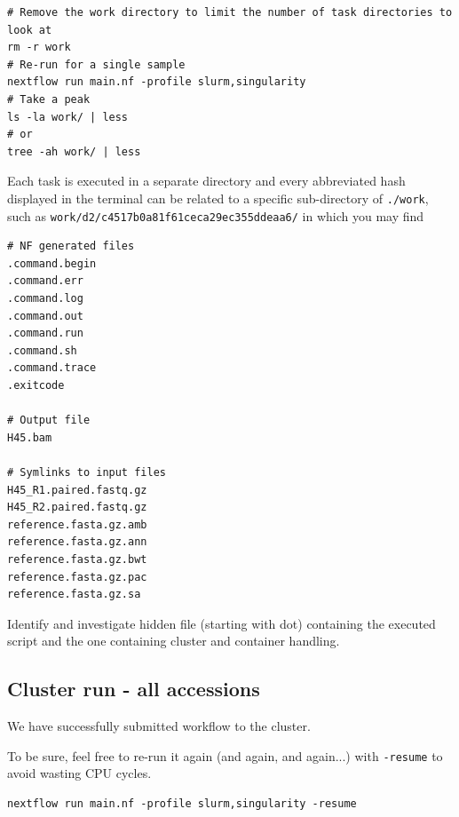 \begin{advanced}
\begin{lstlisting}
# Remove the work directory to limit the number of task directories to look at
rm -r work
# Re-run for a single sample
nextflow run main.nf -profile slurm,singularity
# Take a peak
ls -la work/ | less
# or
tree -ah work/ | less
\end{lstlisting}

Each task is executed in a separate directory and every abbreviated hash displayed in the terminal can be related to a specific sub-directory of \texttt{./work},\\ such as
\texttt{work/d2/c4517b0a81f61ceca29ec355ddeaa6/} in which you may find

\begin{lstlisting}
# NF generated files
.command.begin
.command.err
.command.log
.command.out
.command.run
.command.sh
.command.trace
.exitcode

# Output file
H45.bam

# Symlinks to input files
H45_R1.paired.fastq.gz
H45_R2.paired.fastq.gz
reference.fasta.gz.amb
reference.fasta.gz.ann
reference.fasta.gz.bwt
reference.fasta.gz.pac
reference.fasta.gz.sa
\end{lstlisting}

Identify and investigate hidden file (starting with dot) containing the executed script and the one containing cluster and container handling. 

%
%

\end{advanced}


\subsection{Cluster run - all accessions}

We have successfully submitted workflow to the cluster. 

To be sure, feel free to re-run it again (and again, and again...) 
with \texttt{-resume} to avoid wasting CPU cycles.

\begin{steps}
\begin{lstlisting}
nextflow run main.nf -profile slurm,singularity -resume
\end{lstlisting}
\end{steps}

